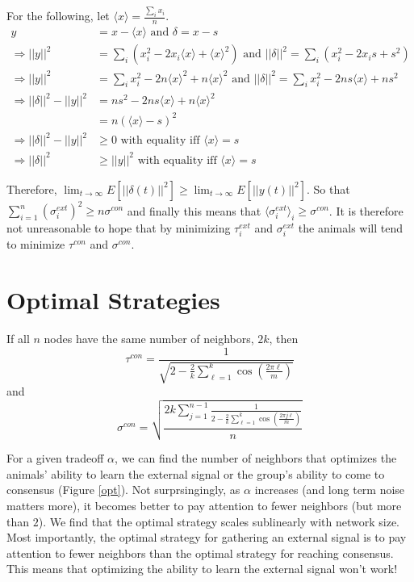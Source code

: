 \documentclass{article}
\begin{document}
\begin{pf}
For the following, let $\langle x\rangle =\frac{\sum_ix_i}{n}$.
\begin{align*}
y&=x-\langle x\rangle \text{ and } \delta=x-s
\\ \Rightarrow ||y||^2&=\sum_i(x_i^2-2x_i\langle x\rangle+\langle x\rangle^2) \text{ and } ||\delta||^2=\sum_i(x_i^2-2x_is+s^2)
\\ \Rightarrow ||y||^2&=\sum_ix_i^2-2n\langle x\rangle^2+n\langle x\rangle^2 \text{ and } ||\delta||^2=\sum_ix_i^2-2ns\langle x\rangle+ns^2
\\ \Rightarrow ||\delta||^2-||y||^2&=ns^2-2ns\langle x\rangle+n\langle x\rangle^2
\\ &=n(\langle x\rangle-s)^2
\\ \Rightarrow ||\delta||^2-||y||^2&\geq 0 \text{ with equality iff } \langle x\rangle=s
\\ \Rightarrow ||\delta||^2&\geq||y||^2 \text{ with equality iff } \langle x\rangle=s
\end{align*}

\end{pf}

Therefore, $\lim_{t\to\infty}E[||\delta(t)||^2]\geq\lim_{t\to\infty}E[||y(t)||^2]$.  So that $\sum_{i=1}^n(\sigma_i^{ext})^2\geq n\sigma^{con}$ and finally this means that $\langle\sigma_i^{ext}\rangle_i\geq \sigma^{con}$.   It is therefore not unreasonable to hope that by minimizing $\tau_i^{ext}$ and $\sigma_i^{ext}$ the animals will tend to minimize $\tau^{con}$ and $\sigma^{con}$.

\section{Optimal Strategies}
If all $n$ nodes have the same number of neighbors, $2k$, then  
\begin{equation}
\tau^{con}=\frac{1}{\sqrt{2-\frac{2}{k}\sum_{\ell=1}^k\cos\left(\frac{2\pi \ell}{m}\right)}} 
\end{equation}
and 
\begin{equation}
\sigma^{con}=\sqrt{\frac{2k\sum_{j=1}^{n-1}\frac{1}{2-\frac{2}{k}\sum_{\ell=1}^k\cos\left(\frac{2\pi j\ell}{m}\right)}}{n}} 
\end{equation}

For a given tradeoff $\alpha$, we can find the number of neighbors that optimizes the animals' ability to learn the external signal or the group's ability to come to consensus (Figure \ref{opt}).
Not surprsingingly, as $\alpha$ increases (and long term noise matters more), it becomes better to pay attention to fewer neighbors (but more than $2$).  We find that the  optimal strategy scales sublinearly with network size.  Most importantly, the optimal strategy for gathering an external signal is to pay attention to fewer neighbors than the optimal strategy for reaching consensus.  This means that optimizing the ability to learn the external signal won't work!
\end{document}
